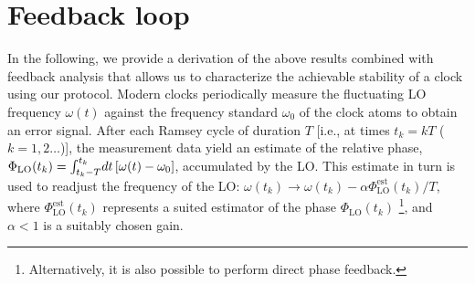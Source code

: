  




\section{Feedback loop}
In the following, we provide a derivation of the above results
combined with feedback analysis that allows us to characterize
the achievable stability of a clock using our protocol. Modern
clocks periodically measure the fluctuating LO frequency $\omega(t)$ against the
frequency standard $\omega_0$ of the clock atoms to
obtain an error signal.
After each Ramsey cycle of duration $T$ [i.e., at times $t_k=kT$
($k=1,2\hdots$)], the measurement data yield
 an estimate of the relative phase, $\Phi_\mathrm{LO}(t_k) =
\int_{t_k-T}^{t_k}\! dt\,[\omega(t) - \omega_0]$, accumulated by the LO.
This estimate in turn is used to readjust the frequency of the LO:  $\omega(t_k)
\rightarrow \omega(t_k) - \alpha\Phi^\mathrm{est}_\mathrm{LO}(t_k)/T$, where
$\Phi^\mathrm{est}_\mathrm{LO}(t_k)$ represents a suited estimator of the phase
$\Phi_\mathrm{LO}(t_k)$ \footnote{Alternatively, it is also possible to perform direct phase
feedback.}, and $\alpha < 1$ is a suitably chosen
gain.

